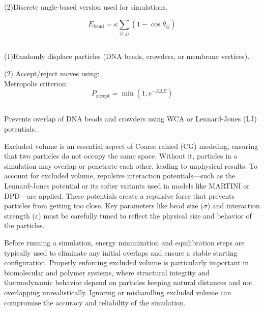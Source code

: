 \documentclass[12pt]{article}
\begin{document}
\begin{flushleft}
\indent\indent (2)Discrete angle-based version used for simulations.

\begin{equation}
E_{\text{bend}} = \kappa \sum_{\langle i,j \rangle} \left(1 - \cos \theta_{ij} \right)
\end{equation}


\subsection*{}

    \indent\indent(1)Randomly displace particles (DNA beads, crowders, or membrane vertices).

   \indent\indent(2) Accept/reject moves using:\\
  \indent\indent\indent Metropolis criterion:
\begin{equation}
P_{\text{accept}} = \min \left(1, e^{-\beta \Delta E}\right)
\end{equation}

    
  \subsection*{}

   \indent\indent Prevents overlap of DNA beads and crowders using WCA or Lennard-Jones (LJ) potentials.
   
   Excluded volume is an essential aspect of Coarse rained (CG) modeling, ensuring that two particles do not occupy the same space. Without it, particles in a simulation may overlap or penetrate each other, leading to unphysical results. To account for excluded volume, repulsive interaction potentials—such as the Lennard-Jones potential or its softer variants used in models like MARTINI or DPD—are applied. These potentials create a repulsive force that prevents particles from getting too close. Key parameters like bead size ($\sigma$) and interaction strength ($\varepsilon$) must be carefully tuned to reflect the physical size and behavior of the particles.

Before running a simulation, energy minimization and equilibration steps are typically used to eliminate any initial overlaps and ensure a stable starting configuration. Properly enforcing excluded volume is particularly important in biomolecular and polymer systems, where structural integrity and thermodynamic behavior depend on particles keeping natural distances and not overlapping unrealistically. Ignoring or mishandling excluded volume can compromise the accuracy and reliability of the simulation.



\end{flushleft}
\end{document}
